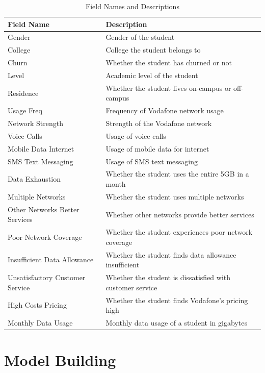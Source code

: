 \documentclass[doublespacing]{report} %
\begin{document}
\begin{table}[H]
\centering
\begin{tabular}{|>{\raggedright\arraybackslash}p{4cm}|p{9cm}|} \hline  

\textbf{Field Name} & \textbf{Description} \\ \hline  

Gender & Gender of the student \\ \hline  
College & College the student belongs to \\ \hline  
Churn & Whether the student has churned or not \\ \hline  
Level & Academic level of the student \\ \hline  
Residence & Whether the student lives on-campus or off-campus \\ \hline  
Usage Freq& Frequency of Vodafone network usage \\ \hline  
Network Strength& Strength of the Vodafone network \\ \hline  
Voice Calls& Usage of voice calls \\ \hline  
Mobile Data Internet& Usage of mobile data for internet \\ \hline  
SMS Text Messaging& Usage of SMS text messaging \\ \hline  
Data Exhaustion& Whether the student uses the entire 5GB in a month \\ \hline  
Multiple Networks& Whether the student uses multiple networks \\ \hline  
Other Networks Better Services& Whether other networks provide better services \\ \hline  
Poor Network Coverage& Whether the student experiences poor network coverage \\ \hline  
Insufficient Data Allowance& Whether the student finds data allowance insufficient \\ \hline  
Unsatisfactory Customer Service& Whether the student is dissatisfied with customer service \\ \hline  
High Costs Pricing& Whether the student finds Vodafone's pricing high \\ \hline  
Monthly Data Usage& Monthly data usage of a student in gigabytes \\ \hline 

\end{tabular}
\caption{Field Names and Descriptions}
\end{table}


\section{Model Building}
\end{document}
